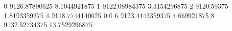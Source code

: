 0 9126.87890625 8.1044921875
1 9122.08984375 3.3154296875
2 9120.59375 1.8193359375
4 9118.7744140625 0.0
6 9123.4443359375 4.669921875
8 9132.52734375 13.7529296875
